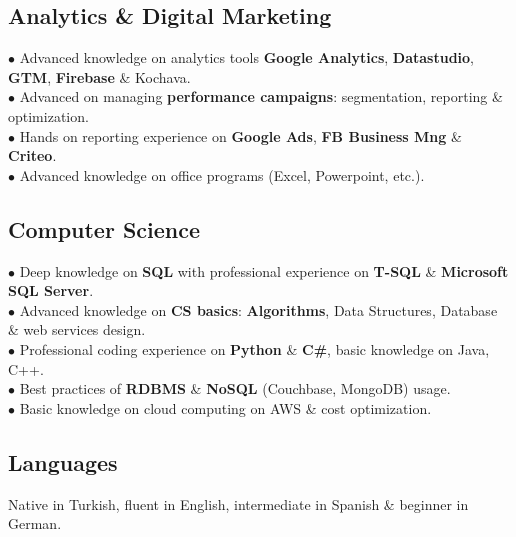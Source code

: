 \documentclass[11pt,twoside,a4paper]{article}
\begin{document}
    \subsection{Analytics \& Digital Marketing}
      $\bullet$ Advanced knowledge on analytics tools \textbf{Google Analytics}, \textbf{Datastudio}, \textbf{GTM}, \textbf{Firebase} \& Kochava.\\
      $\bullet$ Advanced on managing \textbf{performance campaigns}: segmentation, reporting \& optimization.\\
      $\bullet$ Hands on reporting experience on \textbf{Google Ads}, \textbf{FB Business Mng} \& \textbf{Criteo}.\\
      $\bullet$ Advanced knowledge on office programs (Excel, Powerpoint, etc.).
    \subsection{Computer Science}
      $\bullet$ Deep knowledge on \textbf{SQL} with professional experience on \textbf{T-SQL} \& \textbf{Microsoft SQL Server}.\\
      $\bullet$ Advanced knowledge on \textbf{CS basics}: \textbf{Algorithms}, Data Structures, Database \& web services design.\\
      $\bullet$ Professional coding experience on \textbf{Python} \& \textbf{C\#}, basic knowledge on Java, C++.\\
      $\bullet$ Best practices of \textbf{RDBMS} \& \textbf{NoSQL} (Couchbase, MongoDB) usage.\\
      $\bullet$ Basic knowledge on cloud computing on AWS \& cost optimization.
    \subsection{Languages}
      Native in Turkish, fluent in English, intermediate in Spanish \& beginner in German.
\end{document}
